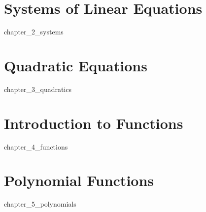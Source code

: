 \documentclass[11pt]{book}
\theoremstyle{definition}  %
\begin{document}
\chapter{Systems of Linear Equations}
\label{Systems of Linear Equations}
{chapter_2_systems}

\chapter{Quadratic Equations}
\label{Quadratic Equations}
{chapter_3_quadratics}

\chapter{Introduction to Functions}
\label{Introduction to Functions}
{chapter_4_functions}

\chapter{Polynomial Functions}
\label{Polynomial Functions}
{chapter_5_polynomials}



\printindex
\end{document}
